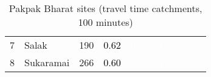 \begin{table}[ht]
\begin{tabular}{C{0.03\textwidth}C{0.12\textwidth}C{0.09\textwidth}C{0.08\textwidth}C{0.08\textwidth}C{0.08\textwidth}C{0.07\textwidth}C{0.07\textwidth}C{0.07\textwidth}C{0.07\textwidth}}
  {7} & Salak & 190 & \textcolor[HTML]{000000}{0.62} & \textcolor[HTML]{FFFFFF}{0.45} & \textcolor[HTML]{FFFFFF}{4} &  &  &  &  \\ 
  {8} & Sukaramai & 266 & \textcolor[HTML]{000000}{0.60} & \textcolor[HTML]{FFFFFF}{0.46} & \textcolor[HTML]{FFFFFF}{4} &  &  &  &  \\ 
  \end{tabular}
\endgroup
\caption{Pakpak Bharat sites (travel time catchments, 100 minutes)} 
\label{tab:pakpak_bharat_time}
\end{table}
